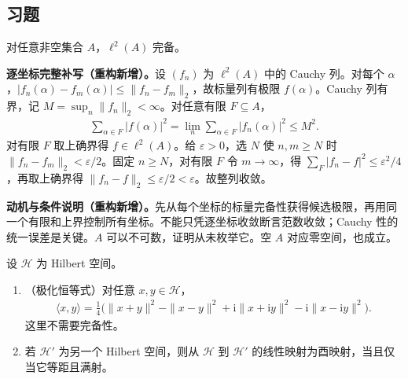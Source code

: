 \documentclass[../../main.tex]{subfiles}
\begin{document}
\subsection*{习题}
\begin{exercise}\label{exercise:ch05-ell2-completeness}
对任意非空集合 $A$，$\ell^2(A)$ 完备。
\end{exercise}
\begin{solution}
\textbf{逐坐标完整补写（重构新增）。}设 $(f_n)$ 为 $\ell^2(A)$ 中的 Cauchy 列。对每个 $\alpha$，$|f_n(\alpha)-f_m(\alpha)|\leqslant\|f_n-f_m\|_2$，故标量列有极限 $f(\alpha)$。Cauchy 列有界，记 $M=\sup_n\|f_n\|_2<\infty$。对任意有限 $F\subseteq A$，
\begin{align*}
\sum_{\alpha\in F}|f(\alpha)|^2
=\lim_n\sum_{\alpha\in F}|f_n(\alpha)|^2\leqslant M^2.
\end{align*}
对有限 $F$ 取上确界得 $f\in\ell^2(A)$。给 $\varepsilon>0$，选 $N$ 使 $n,m\geqslant N$ 时 $\|f_n-f_m\|_2<\varepsilon/2$。固定 $n\geqslant N$，对有限 $F$ 令 $m\to\infty$，得 $\sum_F|f_n-f|^2\leqslant\varepsilon^2/4$，再取上确界得 $\|f_n-f\|_2\leqslant\varepsilon/2<\varepsilon$。故整列收敛。
\end{solution}
\begin{remark}
\textbf{动机与条件说明（重构新增）。}先从每个坐标的标量完备性获得候选极限，再用同一个有限和上界控制所有坐标。不能只凭逐坐标收敛断言范数收敛；Cauchy 性的统一误差是关键。$A$ 可以不可数，证明从未枚举它。空 $A$ 对应零空间，也成立。
\end{remark}
\begin{exercise}\label{exercise:ch05-polarization-unitary}
设 $\mathscr H$ 为 Hilbert 空间。
\begin{enumerate}
\item\label{item:ch05-polarization-identity} （极化恒等式）对任意 $x,y\in\mathscr H$，
\begin{align*}
\langle x,y\rangle=\frac14\bigl(\|x+y\|^2-\|x-y\|^2
+\mathrm i\|x+\mathrm iy\|^2-\mathrm i\|x-\mathrm iy\|^2\bigr).
\end{align*}
这里不需要完备性。
\item\label{item:ch05-unitary-isometric-surjective} 若 $\mathscr H'$ 为另一个 Hilbert 空间，则从 $\mathscr H$ 到 $\mathscr H'$ 的线性映射为酉映射，当且仅当它等距且满射。
\end{enumerate}
\end{exercise}
\end{document}
